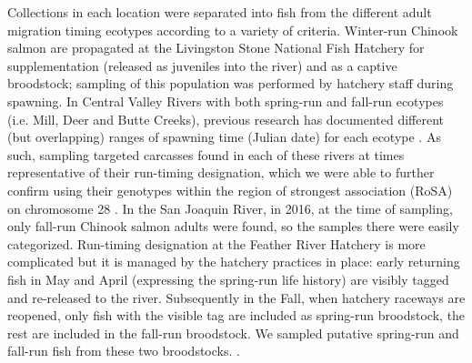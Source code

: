 Collections in each location were separated into fish from the different adult migration timing ecotypes according
to a variety of criteria.  Winter-run Chinook salmon are propagated at the Livingston
Stone National Fish Hatchery for supplementation (released as juveniles into the river) and as a captive broodstock;
sampling of this population was performed by hatchery staff during spawning. In Central Valley Rivers with both
spring-run and fall-run ecotypes (i.e. Mill, Deer and Butte Creeks), previous research has documented different  (but overlapping) ranges of spawning time (Julian date) for each ecotype .  As such, sampling targeted carcasses found in each of these
rivers at times representative of their run-timing designation, which we were able to further confirm using their genotypes
within the region of strongest association (RoSA) on chromosome 28 \citep{thompson2020complex}.
In the San Joaquin River, in 2016, at the time of sampling, only
fall-run Chinook salmon adults were found, so the samples there were
easily categorized. Run-timing
designation at the Feather River Hatchery is more complicated but it is managed by the hatchery practices in place:
early returning fish in May and April (expressing the spring-run life history) are visibly tagged and re-released
to the river. Subsequently in the Fall, when hatchery raceways are reopened, only fish with the visible tag are included
as spring-run broodstock, the rest are included in the fall-run broodstock. We sampled putative spring-run and fall-run fish from these two broodstocks.  .



